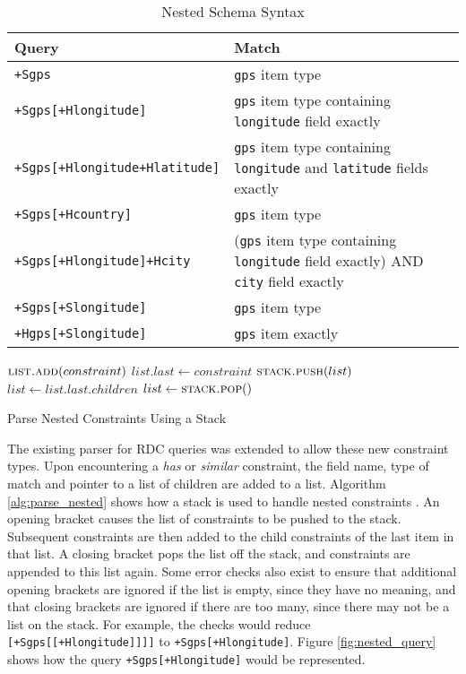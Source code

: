 \documentclass[12pt,twoside,notitlepage]{report}
\begin{document}
\begin{table}
\centering

\begin{tabular}{l p{8cm}}
\hline\hline
Query & Match \\
\hline

{\tt +Sgps}							& {\tt gps} item type \\
{\tt +Sgps[+Hlongitude]}			& {\tt gps} item type containing {\tt longitude} field exactly \\
{\tt +Sgps[+Hlongitude+Hlatitude]}	& {\tt gps} item type containing {\tt longitude} and {\tt latitude} fields exactly \\

{\tt +Sgps[+Hcountry]}				& {\tt gps} item type \\

{\tt +Sgps[+Hlongitude]+Hcity}		& ({\tt gps} item type containing {\tt longitude} field exactly) AND {\tt city} field exactly \\

{\tt +Sgps[+Slongitude]}			& {\tt gps} item type \\
{\tt +Hgps[+Slongitude]}			& {\tt gps} item exactly \\

\hline
\end{tabular}

\caption{Nested Schema Syntax}
\label{tab:nested_schema_syntax}
\end{table}

\begin{algorithm}
\begin{algorithmic}[1]
		\State $\Call{list.add}{constraint}$
		\State $list.last \gets constraint$
	\Else
			\State $\Call{stack.push}{list}$
			\State $list \gets list.last.children$
			\State $list \gets \Call{stack.pop}$
		\EndIf
	\EndIf
\EndWhile
\end{algorithmic}
\caption{Parse Nested Constraints Using a Stack}
\label{alg:parse_nested}
\end{algorithm} 

The existing parser for RDC queries was extended to allow these new constraint types. 
Upon encountering a {\sl has} or {\sl similar} constraint, the field name, type of match and pointer to a list of children are added to a list. 
Algorithm \ref{alg:parse_nested} shows how a stack is used to handle nested constraints \cite{appel1998modern}. 
An opening bracket causes the list of constraints to be pushed to the stack.
Subsequent constraints are then added to the child constraints of the last item in that list. 
A closing bracket pops the list off the stack, and constraints are appended to this list again. 
Some error checks also exist to ensure that additional opening brackets are ignored if the list is empty, since they have no meaning, and that closing brackets are ignored if there are too many, since there may not be a list on the stack. 
For example, the checks would reduce {\tt [+Sgps[[+Hlongitude]]]]} to {\tt +Sgps[+Hlongitude]}.
Figure \ref{fig:nested_query} shows how the query {\tt +Sgps[+Hlongitude]} would be represented.
\end{document}
